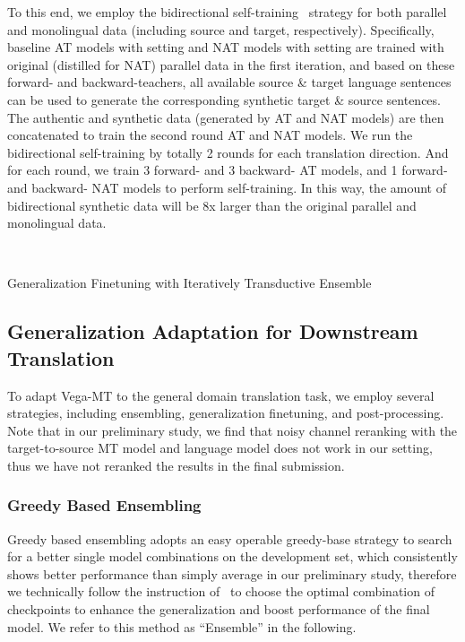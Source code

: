 \documentclass[11pt,a4paper]{article}
\newcommand{\zct}{\color{black}}
\begin{document}
To this end, we employ the bidirectional self-training~\cite{ding2021usyd,liao-etal-2020-multi} strategy for both parallel and monolingual data (including source and target, respectively).
Specifically, baseline AT models with  setting and NAT models with  setting are trained with original (distilled for NAT) parallel data in the first iteration, and based on these forward- and backward-teachers, all available source \& target language sentences can be used to generate the corresponding synthetic target \& source sentences. The authentic and synthetic data (generated by AT and NAT models) are then concatenated to train the second round AT and NAT models. 
We run the bidirectional self-training by totally 2 rounds for each translation direction. And for each round, we train 3 forward- and 3 backward- AT models, and 1 forward- and backward- NAT models to perform self-training. 
In this way, the amount of bidirectional synthetic data will be 8x larger than the original parallel and monolingual data.

\begin{algorithm}[t]
        \\
\caption{Generalization Finetuning {\zct with} Iteratively Transductive Ensemble} 
\label{alg:1}
\end{algorithm}


\subsection{Generalization Adaptation for Downstream Translation}
To adapt Vega-MT to the general domain translation task, we employ several strategies, including ensembling, generalization finetuning, and post-processing. Note that in our preliminary study, we find that noisy channel reranking with the target-to-source MT model and language model does not work in our setting, thus we have not reranked the results in the final submission.

\subsubsection{Greedy Based Ensembling}
\label{ssec:ensemble}
Greedy based ensembling adopts an easy operable greedy-base strategy to search for a better single model combinations on the development set, which consistently shows better performance than simply average in our preliminary study, therefore we technically follow the instruction of~\citet{deng-etal-2018-alibabas} to choose the optimal combination of checkpoints to enhance the generalization and boost performance of the final model. We refer to this method as ``Ensemble'' in the following.
\end{document}
